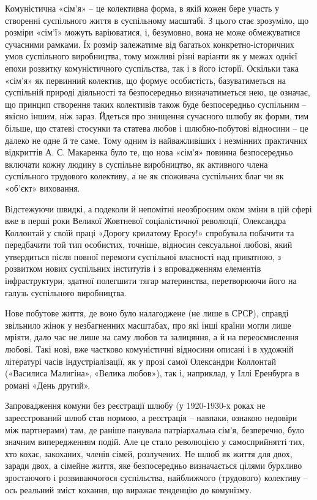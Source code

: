 \documentclass[../main]{subfiles}
\begin{document}
Комуністична «сім’я» – це колективна форма, в якій кожен бере участь у створенні суспільного життя в суспільному масштабі. З цього стає зрозуміло, що розміри «сім’ї» можуть варіюватися, і, безумовно, вона не може обмежуватися сучасними рамками. Їх розмір залежатиме від багатьох конкретно-історичних умов суспільного виробництва, тому можливі різні варіанти як у межах однієї епохи розвитку комуністичного суспільства, так і в його історії. Оскільки така «сім’я» як первинний колектив, що формує особистість, базуватиметься на суспільній природі діяльності та безпосередньо визначатиметься нею, це означає, що принцип створення таких колективів також буде безпосередньо суспільним – якісно іншим, ніж зараз. Йдеться про знищення сучасного шлюбу як форми, тим більше, що статеві стосунки та статева любов і шлюбно-побутові відносини – це далеко не одне й те саме. Тому одним із найважливіших і незмінних практичних відкриттів А. С. Макаренка було те, що нова «сім’я» повинна безпосередньо включати кожну людину в суспільне виробництво, як активного члена суспільного трудового колективу, а не як споживача суспільних благ чи як «об’єкт» виховання.

Відстежуючи швидкі, а подеколи й непомітні неозброєним оком зміни в цій сфері вже в перші роки Великої Жовтневої соціалістичної революції, Олександра Коллонтай у своїй праці «Дорогу крилатому Еросу!» спробувала побачити та передбачити той тип особистих, точніше, відносин сексуальної любові, який утвердиться після повної перемоги суспільної власності над приватною, з розвитком нових суспільних інститутів і з впровадженням елементів інфраструктури, здатної полегшити тягар материнства, перетворюючи його на галузь суспільного виробництва.

Нове побутове життя, де воно було налагоджене (не лише в СРСР), справді звільнило жінок у незбагненних масштабах, про які інші країни могли лише мріяти, дало час не лише на саму любов та залицяння, а й на переосмислення любові. Такі нові, вже частково комуністичні відносини описані і в художній літературі часів індустріалізації, як у прозі самої Олександри Коллонтай («Василиса Малигіна», «Велика любов»), так і, наприклад, у Іллі Еренбурга в романі «День другий».

Запровадження комуни без реєстрації шлюбу (у 1920-1930-х роках не зареєстрований шлюб став нормою, а реєстрація – навпаки, ознакою недовіри між партнерами) там, де раніше панувала патріархальна сім’я, безперечно, було значним випередженням подій. Але це стало революцією у самосприйнятті тих, хто кохає, закоханих, членів сімей, розлучених. Не шлюб як життя для двох, заради двох, а сімейне життя, яке безпосередньо визначається цілями бурхливо зростаючого і розвиваючогося суспільства, найближчого (трудового) колективу – ось реальний зміст кохання, що виражає тенденцію до комунізму.
\end{document}
